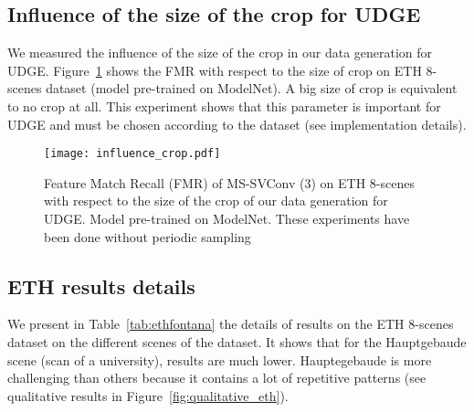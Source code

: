 \documentclass[10pt,twocolumn,letterpaper]{article}
\begin{document}
\subsection{Influence of the size of the crop for UDGE}
We measured the influence of the size of the crop in our data generation for UDGE. Figure~\ref{fig:influence_crop} shows the FMR with respect to the size of crop on ETH 8-scenes dataset (model pre-trained on ModelNet). A big size of crop is equivalent to no crop at all. This experiment shows that this parameter is important for UDGE and must be chosen according to the dataset (see implementation details). 

\begin{figure}
    \centering
    \texttt{[image: influence\_crop.pdf]}
    \caption{Feature Match Recall (FMR) of MS-SVConv (3) on ETH 8-scenes with respect to the size of the crop of our data generation for UDGE. Model pre-trained on ModelNet. These experiments have been done without periodic sampling}
    \label{fig:influence_crop}
\end{figure}



\subsection{ETH results details}

We present in Table~\ref{tab:ethfontana} the details of results on the ETH 8-scenes dataset on the different scenes of the dataset. It shows that for the Hauptgebaude scene (scan of a university), results are much lower. Hauptegebaude is more challenging than others because it contains a lot of repetitive patterns
(see qualitative results in Figure~\ref{fig:qualitative_eth}).
\end{document}
